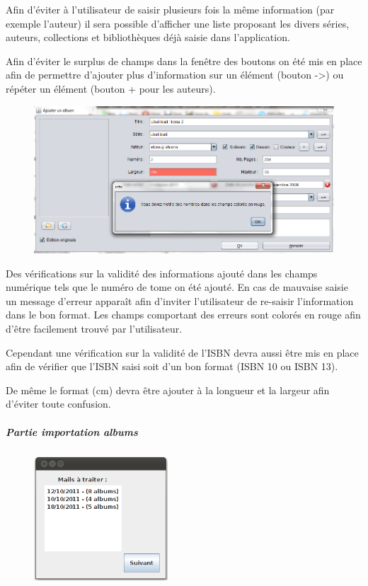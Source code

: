 \documentclass[etudiants]{support-iutrs}
\begin{document}
Afin d'éviter à l'utilisateur de saisir plusieurs fois la même information (par exemple l'auteur) il sera possible d'afficher une liste proposant les divers séries, auteurs, collections et bibliothèques déjà saisie dans l'application.

Afin d'éviter le surplus de champs dans la fenêtre des boutons on été mis en place afin de permettre d'ajouter plus d'information sur un élément (bouton ->) ou répéter un élément (bouton + pour les auteurs).

\begin{figure}[h!]
\begin{center}
\includegraphics[width=12cm]{img/app_pc_maquette_erreur.png}
\end{center}
\end{figure}

Des vérifications sur la validité des informations ajouté dans les champs numérique tels que le numéro de tome on été ajouté. 
En cas de mauvaise saisie un message d'erreur apparaît afin d'inviter l'utilisateur de re-saisir l'information dans le bon format.
Les champs comportant des erreurs sont colorés en rouge afin d'être facilement trouvé par l'utilisateur. 

Cependant une vérification sur la validité de l'ISBN devra aussi être mis en place afin de vérifier que l'ISBN saisi soit d'un bon format (ISBN 10 ou ISBN 13).

De même le format (cm) devra être ajouter à la longueur et la largeur afin d'éviter toute confusion.    
\clearpage

\subparagraph{Partie importation albums}

\begin{figure}
\includegraphics[width=5cm]{img/import_mail.png}
\end{figure}\subparagraph{}
\end{document}
